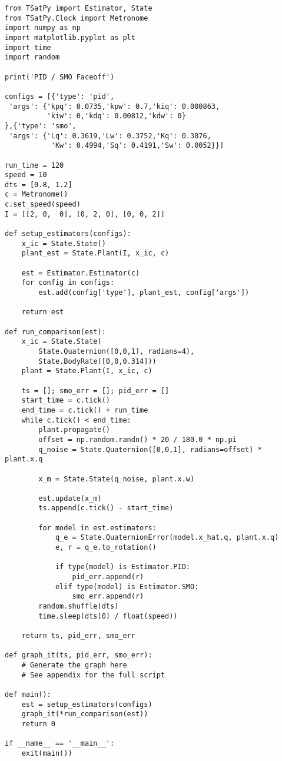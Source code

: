 \begin{singlespace}
  \begin{verbatim}
from TSatPy import Estimator, State
from TSatPy.Clock import Metronome
import numpy as np
import matplotlib.pyplot as plt
import time
import random

print('PID / SMO Faceoff')

configs = [{'type': 'pid',
 'args': {'kpq': 0.0735,'kpw': 0.7,'kiq': 0.000863,
          'kiw': 0,'kdq': 0.00812,'kdw': 0}
},{'type': 'smo',
 'args': {'Lq': 0.3619,'Lw': 0.3752,'Kq': 0.3076,
           'Kw': 0.4994,'Sq': 0.4191,'Sw': 0.0052}}]

run_time = 120
speed = 10
dts = [0.8, 1.2]
c = Metronome()
c.set_speed(speed)
I = [[2, 0,  0], [0, 2, 0], [0, 0, 2]]

def setup_estimators(configs):
    x_ic = State.State()
    plant_est = State.Plant(I, x_ic, c)

    est = Estimator.Estimator(c)
    for config in configs:
        est.add(config['type'], plant_est, config['args'])

    return est

def run_comparison(est):
    x_ic = State.State(
        State.Quaternion([0,0,1], radians=4),
        State.BodyRate([0,0,0.314]))
    plant = State.Plant(I, x_ic, c)

    ts = []; smo_err = []; pid_err = []
    start_time = c.tick()
    end_time = c.tick() + run_time
    while c.tick() < end_time:
        plant.propagate()
        offset = np.random.randn() * 20 / 180.0 * np.pi
        q_noise = State.Quaternion([0,0,1], radians=offset) * plant.x.q

        x_m = State.State(q_noise, plant.x.w)

        est.update(x_m)
        ts.append(c.tick() - start_time)

        for model in est.estimators:
            q_e = State.QuaternionError(model.x_hat.q, plant.x.q)
            e, r = q_e.to_rotation()

            if type(model) is Estimator.PID:
                pid_err.append(r)
            elif type(model) is Estimator.SMO:
                smo_err.append(r)
        random.shuffle(dts)
        time.sleep(dts[0] / float(speed))

    return ts, pid_err, smo_err

def graph_it(ts, pid_err, smo_err):
    # Generate the graph here
    # See appendix for the full script

def main():
    est = setup_estimators(configs)
    graph_it(*run_comparison(est))
    return 0

if __name__ == '__main__':
    exit(main())
  \end{verbatim}
\nocite{minted}
\end{singlespace}

